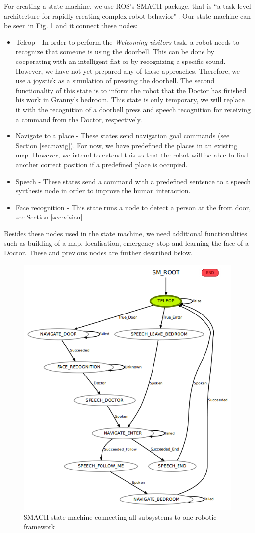 \documentclass[conference]{IEEEtran}
\begin{document}
For creating a state machine, we use ROS's SMACH package, that is ``a task-level architecture for rapidly creating complex robot behavior" \cite{smach}. Our state machine can be seen in Fig. \ref{fig:smach} and it connect these nodes:
\begin{itemize}
\item Teleop - In order to perform the \textit{Welcoming visitors} task, a robot needs to recognize that someone is using the doorbell. This can be done by cooperating with an intelligent flat or by recognizing a specific sound. However, we have not yet prepared any of these approaches. Therefore, we use a joystick as a simulation of pressing the doorbell. 
The second functionality of this state is to inform the robot that the Doctor has finished his work in Granny's bedroom. This state is only temporary, we will replace it with the recognition of a doorbell press and speech recognition for receiving a command from the Doctor, respectively.
\item Navigate to a place - These states send navigation goal commands (see Section \ref{sec:navig}). For now, we have predefined the places in an existing map. However, we intend to extend this so that the robot will be able to find another correct position if a predefined place is occupied.
\item Speech - These states send a command with a predefined sentence to a speech synthesis node in order to improve the human interaction.
\item Face recognition - This state runs a node to detect a person at the front door, see Section \ref{sec:vision}.
\end{itemize}

Besides these nodes used in the state machine, we need additional functionalities such as building of a map, localisation, emergency stop and learning the face of a Doctor. These and previous nodes are further described below.

\begin{figure}[!htb]
\centering
\includegraphics[width=3.in]{state_machine.png}
\caption{SMACH state machine connecting all subsystems to one robotic framework}
\label{fig:smach}
\end{figure}
\end{document}
